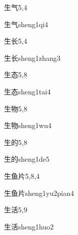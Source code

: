 \begin{entry}{生气}{5,4}
  \begin{phonetics}{生气}{sheng1qi4}
  \end{phonetics}
\end{entry}

\begin{entry}{生长}{5,4}
  \begin{phonetics}{生长}{sheng1zhang3}
  \end{phonetics}
\end{entry}

\begin{entry}{生态}{5,8}
  \begin{phonetics}{生态}{sheng1tai4}
  \end{phonetics}
\end{entry}

\begin{entry}{生物}{5,8}
  \begin{phonetics}{生物}{sheng1wu4}
  \end{phonetics}
\end{entry}

\begin{entry}{生的}{5,8}
  \begin{phonetics}{生的}{sheng1de5}
  \end{phonetics}
\end{entry}

\begin{entry}{生鱼片}{5,8,4}
  \begin{phonetics}{生鱼片}{sheng1yu2pian4}
  \end{phonetics}
\end{entry}

\begin{entry}{生活}{5,9}
  \begin{phonetics}{生活}{sheng1huo2}
  \end{phonetics}
\end{entry}

